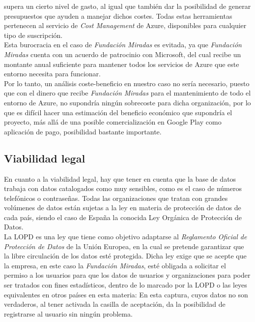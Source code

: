 supera un cierto nivel de gasto, al igual que también dar la posibilidad de
generar presupuestos que ayuden a manejar dichos costes. Todas estas
herramientas pertenecen al servicio de \textit{Cost Management} de Azure,
disponibles para cualquier tipo de suscripción.
\\
Esta burocracia en el caso de \textit{Fundación Miradas} es evitada, ya que
\textit{Fundación Miradas} cuenta con un acuerdo de patrocinio con Microsoft,
del cual recibe un montante anual suficiente para mantener todos los servicios
de Azure que este entorno necesita para funcionar.
\\
Por lo tanto, un análisis coste-beneficio en nuestro caso no sería necesario,
puesto que con el dinero que recibe \textit{Fundación Miradas} para el
mantenimiento de todo el entorno de Azure, no supondría ningún sobrecoste para
dicha organización, por lo que es difícil hacer una estimación del beneficio
económico que supondría el proyecto, más allá de una posible comercialización en
Google Play como aplicación de pago, posibilidad bastante importante.
\subsection{Viabilidad legal}
En cuanto a la viabilidad legal, hay que tener en cuenta que la base de datos
trabaja con datos catalogados como muy sensibles, como es el caso de números
telefónicos o contraseñas. Todas las organizaciones que tratan con grandes
volúmenes de datos están sujetas a la ley en materia de protección de datos de
cada país, siendo el caso de España la conocida Ley Orgánica de Protección de
Datos. 
\\
La LOPD es una ley que tiene como objetivo adaptarse al \textit{Reglamento
Oficial de Protección de Datos} de la Unión Europea, en la cual se pretende
garantizar que la libre circulación de los datos esté protegida. Dicha ley exige
que se acepte que la empresa, en este caso la \textit{Fundación Miradas}, esté
obligada a solicitar el permiso a los usuarios para que los datos de usuarios y
organizaciones para poder ser tratados con fines estadísticos, dentro de lo
marcado por la LOPD o las leyes equivalentes en otros países en esta materia:
 En esta captura, cuyos datos no
son verdaderos, al tener activada la casilla de aceptación, da la posibilidad de
registrarse al usuario sin ningún problema.

